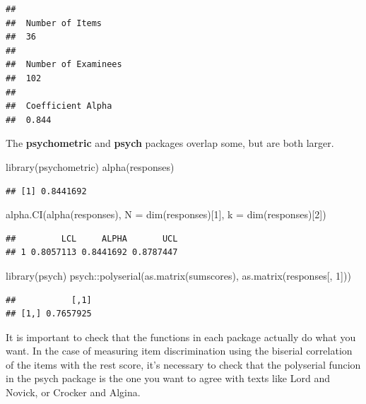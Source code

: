 \documentclass[
]{book}
\newenvironment{Shaded}{\begin{snugshade}}{\end{snugshade}}
\newcommand{\AttributeTok}[1]{\textcolor[rgb]{0.77,0.63,0.00}{#1}}
\newcommand{\DecValTok}[1]{\textcolor[rgb]{0.00,0.00,0.81}{#1}}
\newcommand{\FunctionTok}[1]{\textcolor[rgb]{0.00,0.00,0.00}{#1}}
\newcommand{\NormalTok}[1]{#1}
\newcommand{\SpecialCharTok}[1]{\textcolor[rgb]{0.00,0.00,0.00}{#1}}
\begin{document}
\begin{verbatim}
## 
##  Number of Items 
##  36 
## 
##  Number of Examinees 
##  102 
## 
##  Coefficient Alpha 
##  0.844
\end{verbatim}

The \textbf{psychometric} and \textbf{psych} packages overlap some, but are both larger.

\begin{Shaded}
\begin{Highlighting}[]
\FunctionTok{library}\NormalTok{(psychometric)}
\FunctionTok{alpha}\NormalTok{(responses)}
\end{Highlighting}
\end{Shaded}

\begin{verbatim}
## [1] 0.8441692
\end{verbatim}

\begin{Shaded}
\begin{Highlighting}[]
\FunctionTok{alpha.CI}\NormalTok{(}\FunctionTok{alpha}\NormalTok{(responses), }\AttributeTok{N =} \FunctionTok{dim}\NormalTok{(responses)[}\DecValTok{1}\NormalTok{], }\AttributeTok{k =} \FunctionTok{dim}\NormalTok{(responses)[}\DecValTok{2}\NormalTok{])}
\end{Highlighting}
\end{Shaded}

\begin{verbatim}
##         LCL     ALPHA       UCL
## 1 0.8057113 0.8441692 0.8787447
\end{verbatim}

\begin{Shaded}
\begin{Highlighting}[]
\FunctionTok{library}\NormalTok{(psych)}
\NormalTok{psych}\SpecialCharTok{::}\FunctionTok{polyserial}\NormalTok{(}\FunctionTok{as.matrix}\NormalTok{(sumscores), }\FunctionTok{as.matrix}\NormalTok{(responses[, }\DecValTok{1}\NormalTok{]))}
\end{Highlighting}
\end{Shaded}

\begin{verbatim}
##           [,1]
## [1,] 0.7657925
\end{verbatim}

It is important to check that the functions in each package actually do what you want. In the case of measuring item discrimination using the biserial correlation of the items with the rest score, it's necessary to check that the polyserial funcion in the psych package is the one you want to agree with texts like Lord and Novick, or Crocker and Algina.
\end{document}
